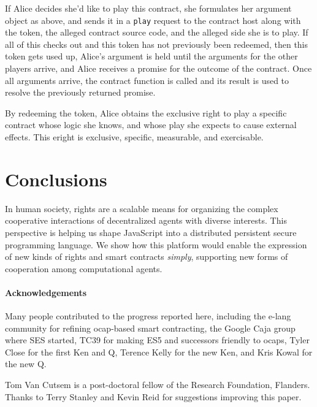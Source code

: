 \documentclass{llncs}
\begin{document}
If Alice decides she'd like to play this contract, she formulates her argument object as above, and sends it in a {\tt play} request to the contract host along with the token, the alleged contract source code, and the alleged side she is to play. If all of this checks out and this token has not previously been redeemed, then this token gets used up, Alice's argument is held until the arguments for the other players arrive, and Alice receives a promise for the outcome of the contract. Once all arguments arrive, the contract function is called and its result is used to resolve the previously returned promise.

By redeeming the token, Alice obtains the exclusive right to play a specific contract whose logic she knows, and whose play she expects to cause external effects. This eright is exclusive, specific, measurable, and exercisable. 

\section*{Conclusions}
\label{conclusions}

In human society, rights are a scalable means for organizing the complex cooperative interactions of decentralized agents with diverse interests. This perspective is helping us shape JavaScript into a distributed persistent secure programming language. We show how this platform would enable the expression of new kinds of rights and smart contracts \emph{simply}, supporting new forms of cooperation among computational agents.



\paragraph{Acknowledgements}

Many people contributed to the progress reported here, including the e-lang community for refining ocap-based smart contracting, the Google Caja group where SES started, TC39 for making ES5 and successors friendly to ocaps, Tyler Close for the first Ken and Q, Terence Kelly for the new Ken, and Kris Kowal for the new Q. 

Tom Van Cutsem is a post-doctoral fellow of the Research Foundation, Flanders. Thanks to Terry Stanley and Kevin Reid for suggestions improving this paper.


% 

\end{document}
